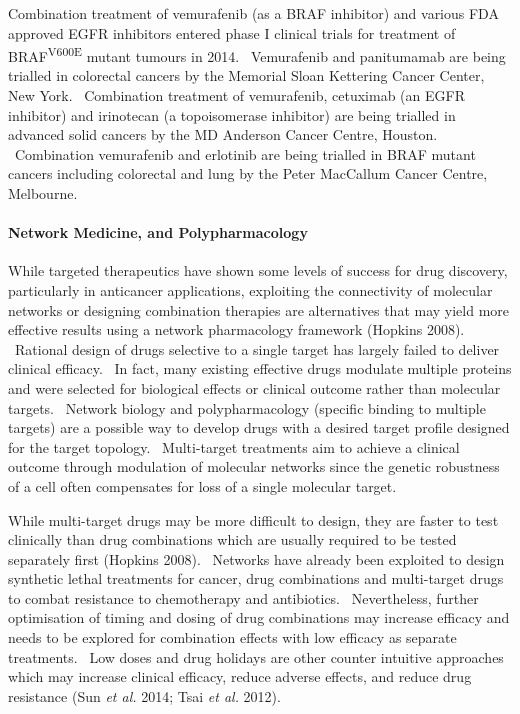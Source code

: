 Combination treatment of vemurafenib (as a BRAF inhibitor) and various FDA approved EGFR inhibitors entered phase I clinical trials for treatment of BRAF\textsuperscript{V600E} mutant tumours in 2014. \ Vemurafenib and panitumamab are being trialled in colorectal cancers by the Memorial Sloan Kettering Cancer Center, New York. \ Combination treatment of vemurafenib, cetuximab (an EGFR inhibitor) and irinotecan (a topoisomerase inhibitor) are being trialled in advanced solid cancers by the MD Anderson Cancer Centre, Houston. \ Combination vemurafenib and erlotinib are being trialled in BRAF mutant cancers including colorectal and lung by the Peter MacCallum Cancer Centre, Melbourne. \  

\paragraph{ Network Medicine, and Polypharmacology}

While targeted therapeutics have shown some levels of success for drug discovery, particularly in anticancer applications, exploiting the connectivity of molecular networks or designing combination therapies are alternatives that may yield more effective results using a network pharmacology framework (Hopkins 2008). \ Rational design of drugs selective to a single target has largely failed to deliver clinical efficacy. \ In fact, many existing effective drugs modulate multiple proteins and were selected for biological effects or clinical outcome rather than molecular targets. \ Network biology and polypharmacology (specific binding to multiple targets) are a possible way to develop drugs with a desired target profile designed for the target topology. \ Multi-target treatments aim to achieve a clinical outcome through modulation of molecular networks since the genetic robustness of a cell often compensates for loss of a single molecular target. \  

While multi-target drugs may be more difficult to design, they are faster to test clinically than drug combinations which are usually required to be tested separately first (Hopkins 2008). \ Networks have already been exploited to design synthetic lethal treatments for cancer, drug combinations and multi-target drugs to combat resistance to chemotherapy and antibiotics. \ Nevertheless, further optimisation of timing and dosing of drug combinations may increase efficacy and needs to be explored for combination effects with low efficacy as separate treatments. \ Low doses and drug holidays are other counter intuitive approaches which may increase clinical efficacy, reduce adverse effects, and reduce drug resistance (Sun\textit{ et al.} 2014; Tsai\textit{ et al.} 2012). \  


